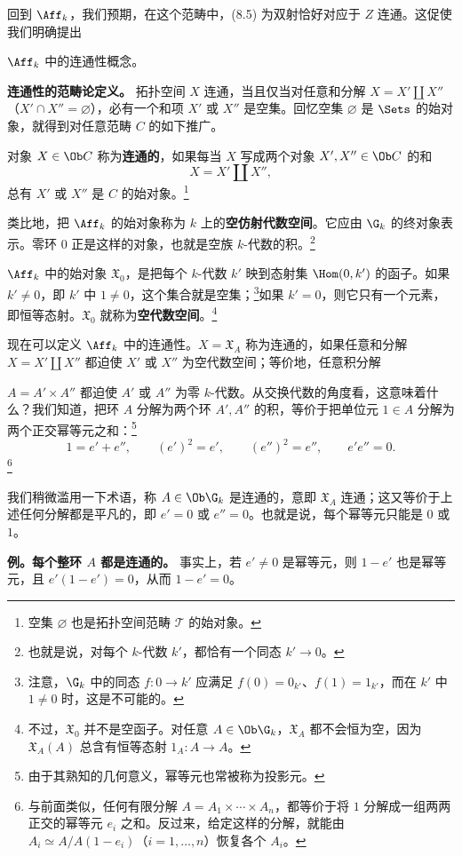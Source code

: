 回到 $\Aff_k$，我们预期，在这个范畴中，(8.5) 为双射恰好对应于 $Z$ 连通。这促使我们明确提出

$\Aff_k$ 中的连通性概念。

\textbf{连通性的范畴论定义。} 拓扑空间 $X$ 连通，当且仅当对任意和分解 $X=X'\amalg X''$（$X'\cap X''=\varnothing$），必有一个和项 $X'$ 或 $X''$ 是空集。回忆空集 $\varnothing$ 是 $\Sets$ 的始对象，就得到对任意范畴 $C$ 的如下推广。

对象 $X\in\Ob C$ 称为\textbf{连通的}，如果每当 $X$ 写成两个对象 $X',X''\in\Ob C$ 的和
\[
X=X'\amalg X'',
\]
总有 $X'$ 或 $X''$ 是 $C$ 的始对象。\footnote{空集 $\varnothing$ 也是拓扑空间范畴 $\mathcal T$ 的始对象。}

类比地，把 $\Aff_k$ 的始对象称为 $k$ 上的\textbf{空仿射代数空间}。它应由 $\G_k$ 的终对象表示。零环 $0$ 正是这样的对象，也就是空族 $k$-代数的积。\footnote{也就是说，对每个 $k$-代数 $k'$，都恰有一个同态 $k'\to0$。}

$\Aff_k$ 中的始对象 $\mathfrak X_0$，是把每个 $k$-代数 $k'$ 映到态射集 $\Hom(0,k')$ 的函子。如果 $k'\ne0$，即 $k'$ 中 $1\ne0$，这个集合就是空集；\footnote{注意，$\G_k$ 中的同态 $f:0\to k'$ 应满足 $f(0)=0_{k'}$、$f(1)=1_{k'}$，而在 $k'$ 中 $1\ne0$ 时，这是不可能的。}如果 $k'=0$，则它只有一个元素，即恒等态射。$\mathfrak X_0$ 就称为\textbf{空代数空间}。\footnote{不过，$\mathfrak X_0$ 并不是空函子。对任意 $A\in\Ob\G_k$，$\mathfrak X_A$ 都不会恒为空，因为 $\mathfrak X_A(A)$ 总含有恒等态射 $1_A:A\to A$。}

现在可以定义 $\Aff_k$ 中的连通性。$X=\mathfrak X_A$ 称为连通的，如果任意和分解 $X=X'\amalg X''$ 都迫使 $X'$ 或 $X''$ 为空代数空间；等价地，任意积分解

$A=A'\times A''$ 都迫使 $A'$ 或 $A''$ 为零 $k$-代数。从交换代数的角度看，这意味着什么？我们知道，把环 $A$ 分解为两个环 $A',A''$ 的积，等价于把单位元 $1\in A$ 分解为两个正交幂等元之和：\footnote{由于其熟知的几何意义，幂等元也常被称为投影元。}
\[
1=e'+e'',\qquad (e')^2=e',\qquad(e'')^2=e'',\qquad e'e''=0.
\]
\footnote{与前面类似，任何有限分解 $A=A_1\times\cdots\times A_n$，都等价于将 $1$ 分解成一组两两正交的幂等元 $e_i$ 之和。反过来，给定这样的分解，就能由 $A_i\simeq A/A(1-e_i)$（$i=1,\ldots,n$）恢复各个 $A_i$。}

我们稍微滥用一下术语，称 $A\in\Ob\G_k$ 是连通的，意即 $\mathfrak X_A$ 连通；这又等价于上述任何分解都是平凡的，即 $e'=0$ 或 $e''=0$。也就是说，每个幂等元只能是 $0$ 或 $1$。

\textbf{例。每个整环 $A$ 都是连通的。} 事实上，若 $e'\ne0$ 是幂等元，则 $1-e'$ 也是幂等元，且 $e'(1-e')=0$，从而 $1-e'=0$。

